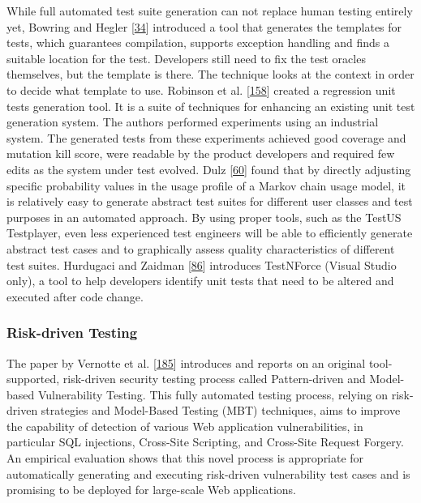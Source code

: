 \documentclass[]{book}
\begin{document}
While full automated test suite generation can not replace human testing
entirely yet, Bowring and Hegler
{[}\protect\hyperlink{ref-bowring2014obsidian}{34}{]} introduced a tool
that generates the templates for tests, which guarantees compilation,
supports exception handling and finds a suitable location for the test.
Developers still need to fix the test oracles themselves, but the
template is there. The technique looks at the context in order to decide
what template to use. Robinson et al.
{[}\protect\hyperlink{ref-robinson2011}{158}{]} created a regression
unit tests generation tool. It is a suite of techniques for enhancing an
existing unit test generation system. The authors performed experiments
using an industrial system. The generated tests from these experiments
achieved good coverage and mutation kill score, were readable by the
product developers and required few edits as the system under test
evolved. Dulz {[}\protect\hyperlink{ref-dulz2013model}{60}{]} found that
by directly adjusting specific probability values in the usage profile
of a Markov chain usage model, it is relatively easy to generate
abstract test suites for different user classes and test purposes in an
automated approach. By using proper tools, such as the TestUS
Testplayer, even less experienced test engineers will be able to
efficiently generate abstract test cases and to graphically assess
quality characteristics of different test suites. Hurdugaci and Zaidman
{[}\protect\hyperlink{ref-hurdugaci2012}{86}{]} introduces TestNForce
(Visual Studio only), a tool to help developers identify unit tests that
need to be altered and executed after code change.

\subsubsection{Risk-driven Testing}\label{risk-driven-testing}

The paper by Vernotte et al.
{[}\protect\hyperlink{ref-vernotte2015}{185}{]} introduces and reports
on an original tool-supported, risk-driven security testing process
called Pattern-driven and Model-based Vulnerability Testing. This fully
automated testing process, relying on risk-driven strategies and
Model-Based Testing (MBT) techniques, aims to improve the capability of
detection of various Web application vulnerabilities, in particular SQL
injections, Cross-Site Scripting, and Cross-Site Request Forgery. An
empirical evaluation shows that this novel process is appropriate for
automatically generating and executing risk-driven vulnerability test
cases and is promising to be deployed for large-scale Web applications.
\end{document}
